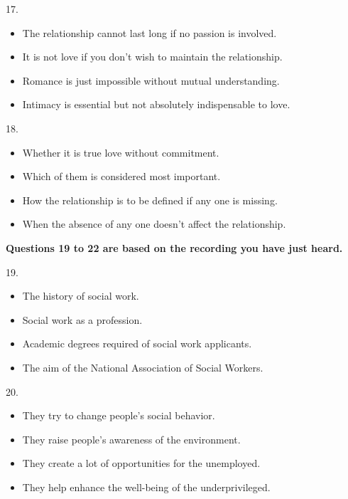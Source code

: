 \documentclass[UTF8,11pt]{ctexart}
\begin{document}
17.


\begin{itemize}[leftmargin=2em,itemsep=.2em,topsep=.4em]\item[A.] The relationship cannot last long if no passion is involved.
\item[B.] It is not love if you don't wish to maintain the relationship.
\item[C.] Romance is just impossible without mutual understanding.
\item[D.] Intimacy is essential but not absolutely indispensable to love.
\end{itemize}

18.


\begin{itemize}[leftmargin=2em,itemsep=.2em,topsep=.4em]\item[A.] Whether it is true love without commitment.
\item[B.] Which of them is considered most important.
\item[C.] How the relationship is to be defined if any one is missing.
\item[D.] When the absence of any one doesn't affect the relationship.
\end{itemize}

\textbf{Questions 19 to 22 are based on the recording you have just heard.}


19.


\begin{itemize}[leftmargin=2em,itemsep=.2em,topsep=.4em]\item[A.] The history of social work.
\item[B.] Social work as a profession.
\item[C.] Academic degrees required of social work applicants.
\item[D.] The aim of the National Association of Social Workers.
\end{itemize}

20.


\begin{itemize}[leftmargin=2em,itemsep=.2em,topsep=.4em]\item[A.] They try to change people's social behavior.
\item[B.] They raise people's awareness of the environment.
\item[C.] They create a lot of opportunities for the unemployed.
\end{itemize}

\begin{itemize}[leftmargin=2em,itemsep=.2em,topsep=.4em]\item[D.] They help enhance the well-being of the underprivileged.
\end{itemize}
\end{document}
